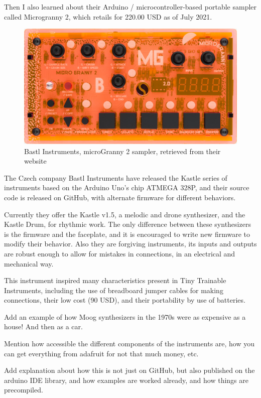 Then I also learned about their Arduino / microcontroller-based portable sampler called Microgranny 2, which retails for 220.00 USD as of July 2021.

\begin{figure}[h]
	\centering
	\includegraphics[width=0.75\linewidth,height=0.25\textheight,keepaspectratio]{images/bastl-microgranny-2.jpg}
	\caption{Bastl Instruments, microGranny 2 sampler, retrieved from their website}
	\label{fig:bastl-microgranny-2}
\end{figure}


The Czech company Bastl Instruments have released the Kastle series of instruments based on the Arduino Uno’s chip ATMEGA 328P, and their source code is released on GitHub, with alternate firmware for different behaviors.

Currently they offer the Kastle v1.5, a melodic and drone synthesizer, and the Kastle Drum, for rhythmic work. The only difference between these synthesizers is the firmware and the faceplate, and it is encouraged to write new firmware to modify their behavior. Also they are forgiving instruments, its inputs and outputs are robust enough to allow for mistakes in connections, in an electrical and mechanical way.

This instrument inspired many characteristics present in Tiny Trainable Instruments, including 
 the use of breadboard jumper cables for making connections, their low cost (90 USD), and their portability by use of batteries.

Add an example of how Moog synthesizers in the 1970s were as expensive as a house!
And then as a car.

Mention how accessible the different components of the instruments are, how you can get everything from adafruit for not that much money, etc.

Add explanation about how this is not just on GitHub, but also published on the arduino IDE library, and how examples are worked already, and how things are precompiled.


